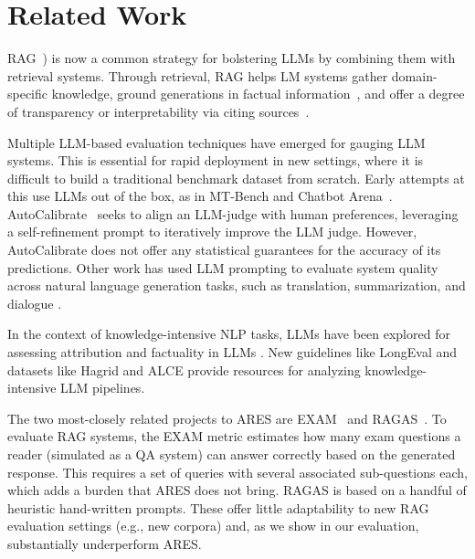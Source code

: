
\section{Related Work}


RAG~\citep{guu2020retrieval,lewis2020retrieval,khattab2021relevance,izacard2022few}) is now a common strategy for bolstering LLMs by combining them with retrieval systems. Through retrieval, RAG helps LM systems gather domain-specific knowledge, ground generations in factual information~\cite{shuster2021retrieval, huo2023retrieving}, and offer a degree of transparency or interpretability via citing sources~\cite{mialon2023augmented}.



Multiple LLM-based evaluation techniques have emerged for gauging LLM systems. This is essential for rapid deployment in new settings, where it is difficult to build a traditional benchmark dataset from scratch.
Early attempts at this use LLMs out of the box, as in MT-Bench and Chatbot Arena~\cite{zheng2023judging}.
AutoCalibrate~\cite{liu2023calibrating} seeks to align an LLM-judge with human preferences, leveraging a self-refinement prompt to iteratively improve the LLM judge. 
However, AutoCalibrate does not offer any statistical guarantees for the accuracy of its predictions.
Other work has used LLM prompting to evaluate system quality across natural language generation tasks, such as translation, summarization, and dialogue  \cite{kocmi2023large,fu2023gptscore, liu2303g, wang2023chatgpt}.

In the context of knowledge-intensive NLP tasks, LLMs have been explored for assessing attribution and factuality in LLMs \cite{min2023factscore, gekhman2023trueteacher, yue2023automatic}.
New guidelines like LongEval \cite{krishna-etal-2023-longeval} and datasets like Hagrid and ALCE \cite{kamalloo2023hagrid, gao2023enabling} provide resources for analyzing knowledge-intensive LLM pipelines.


The two most-closely related projects to ARES are EXAM~\cite{sander2021exam} and RAGAS~\cite{ragas2023}. To evaluate RAG systems, the EXAM metric estimates how many exam questions a reader (simulated as a QA system) can answer correctly based on the generated response. This requires a set of queries with several associated sub-questions each, which adds a burden that ARES does not bring. RAGAS is based on a handful of heuristic hand-written prompts. These offer little adaptability to new RAG evaluation settings (e.g., new corpora) and, as we show in our evaluation, substantially underperform ARES.









